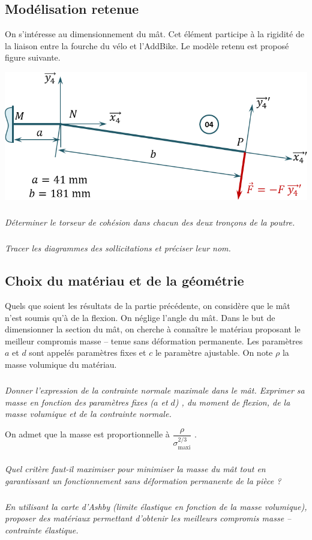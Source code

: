 \documentclass[10pt,fleqn]{article} %
\begin{document}
\begin{multicols}{2}
\subsection*{Modélisation retenue}
On s'intéresse au dimensionnement du mât. Cet élément participe à la rigidité de la liaison entre la fourche du vélo et l'AddBike. Le modèle retenu est proposé figure suivante. 


\begin{center}
\includegraphics[width=\linewidth]{images/fig_03}
\end{center}


\subparagraph{}\textit{Déterminer le torseur de cohésion dans chacun des deux tronçons de la poutre.} 
\subparagraph{}\textit{Tracer les diagrammes des sollicitations et préciser leur nom.}
\subsection*{Choix du matériau et de la géométrie}

Quels que soient les résultats de la partie précédente, on considère que le mât n’est soumis qu’à de la flexion. On néglige l’angle du mât. Dans le but de dimensionner la section du mât, on cherche à connaître le matériau proposant le meilleur compromis masse -- tenue sans déformation permanente. 
Les paramètres $a$ et $d$  sont appelés paramètres fixes et $c$  le paramètre ajustable. 
On note $\rho$ la masse volumique du matériau. 

\subparagraph{}\textit{Donner l’expression de la contrainte normale maximale dans le mât. 
Exprimer sa masse en fonction des paramètres fixes ($a$  et $d$) , du moment de flexion, de la masse volumique et de la contrainte normale. }
	

On admet que la masse est proportionnelle à $\dfrac{\rho}{\sigma_{\text{maxi}}^{2/3}}$ .

\subparagraph{}\textit{Quel critère faut-il maximiser pour minimiser la masse du mât tout en garantissant un fonctionnement sans déformation permanente de la pièce ?}
\subparagraph{}\textit{En utilisant la carte d’Ashby (limite élastique en fonction de la masse volumique), proposer des matériaux permettant d’obtenir les meilleurs compromis masse – contrainte élastique.}
	


\end{multicols}
\end{document}
